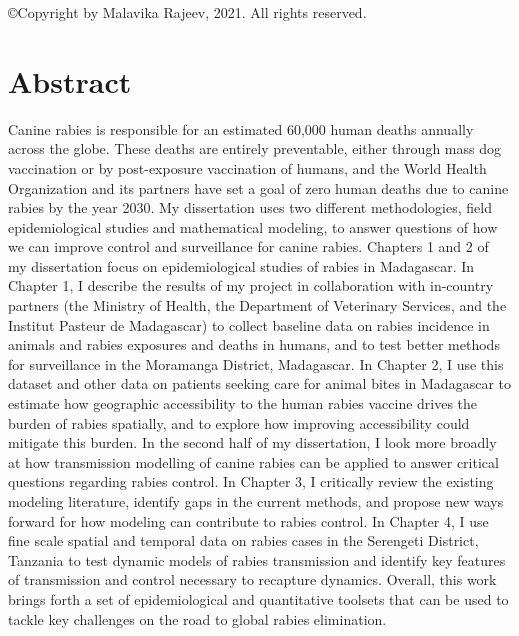 
\begin{center}

\copyright  Copyright by Malavika Rajeev, 2021. All rights reserved.

\end{center}

\frontmatter

\setcounter{page}{3}  %

\section*{Abstract}

Canine rabies is responsible for an estimated 60,000 human deaths annually across the globe. These deaths are entirely preventable, either through mass dog vaccination or by post-exposure vaccination of humans, and the World Health Organization and its partners have set a goal of zero human deaths due to canine rabies by the year 2030. My dissertation uses two different methodologies, field epidemiological studies and mathematical modeling, to answer questions of how we can improve control and surveillance for canine rabies. Chapters 1 and 2 of my dissertation focus on epidemiological studies of rabies in Madagascar. In Chapter 1, I describe the results of my project in collaboration with in-country partners (the Ministry of Health, the Department of Veterinary Services, and the Institut Pasteur de Madagascar) to collect baseline data on rabies incidence in animals and rabies exposures and deaths in humans, and to test better methods for surveillance in the Moramanga District, Madagascar. In Chapter 2, I use this dataset and other data on patients seeking care for animal bites in Madagascar to estimate how geographic accessibility to the human rabies vaccine drives the burden of rabies spatially, and to explore how improving accessibility could mitigate this burden. In the second half of my dissertation, I look more broadly at how transmission modelling of canine rabies can be applied to answer critical questions regarding rabies control. In Chapter 3, I critically review the existing modeling literature, identify gaps in the current methods, and propose new ways forward for how modeling can contribute to rabies control. In Chapter 4, I use fine scale spatial and temporal data on rabies cases in the Serengeti District, Tanzania to test dynamic models of rabies transmission and identify key features of transmission and control necessary to recapture dynamics. Overall, this work brings forth a set of epidemiological and quantitative toolsets that can be used to tackle key challenges on the road to global rabies elimination. 

